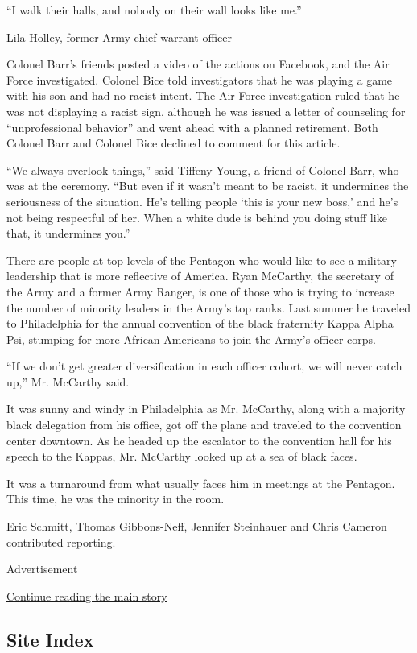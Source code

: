 ``I walk their halls, and nobody on their wall looks like me.''

Lila Holley, former Army chief warrant officer

Colonel Barr's friends posted a video of the actions on Facebook, and
the Air Force investigated. Colonel Bice told investigators that he was
playing a game with his son and had no racist intent. The Air Force
investigation ruled that he was not displaying a racist sign, although
he was issued a letter of counseling for ``unprofessional behavior'' and
went ahead with a planned retirement. Both Colonel Barr and Colonel Bice
declined to comment for this article.

``We always overlook things,'' said Tiffeny Young, a friend of Colonel
Barr, who was at the ceremony. ``But even if it wasn't meant to be
racist, it undermines the seriousness of the situation. He's telling
people `this is your new boss,' and he's not being respectful of her.
When a white dude is behind you doing stuff like that, it undermines
you.''

There are people at top levels of the Pentagon who would like to see a
military leadership that is more reflective of America. Ryan McCarthy,
the secretary of the Army and a former Army Ranger, is one of those who
is trying to increase the number of minority leaders in the Army's top
ranks. Last summer he traveled to Philadelphia for the annual convention
of the black fraternity Kappa Alpha Psi, stumping for more
African-Americans to join the Army's officer corps.

``If we don't get greater diversification in each officer cohort, we
will never catch up,'' Mr. McCarthy said.

It was sunny and windy in Philadelphia as Mr. McCarthy, along with a
majority black delegation from his office, got off the plane and
traveled to the convention center downtown. As he headed up the
escalator to the convention hall for his speech to the Kappas, Mr.
McCarthy looked up at a sea of black faces.

It was a turnaround from what usually faces him in meetings at the
Pentagon. This time, he was the minority in the room.

Eric Schmitt, Thomas Gibbons-Neff, Jennifer Steinhauer and Chris Cameron
contributed reporting.

Advertisement

\protect\hyperlink{after-bottom}{Continue reading the main story}

\hypertarget{site-index}{%
\subsection{Site Index}\label{site-index}}

